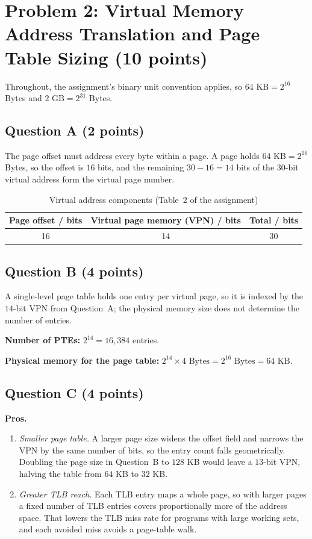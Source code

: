\section*{Problem 2: Virtual Memory Address Translation and Page Table Sizing (10 points)}

Throughout, the assignment's binary unit convention applies, so
$64\text{ KB} = 2^{16}$ Bytes and $2\text{ GB} = 2^{31}$ Bytes.

\subsection*{Question A (2 points)}

The page offset must address every byte within a page. A page holds
$64\text{ KB} = 2^{16}$ Bytes, so the offset is $16$ bits, and the remaining
$30 - 16 = 14$ bits of the $30$-bit virtual address form the virtual page number.

\begin{table}[H]
  \centering
  \caption{Virtual address components (Table~2 of the assignment)}
  \label{p2:tab:vaddr}
  \begin{tabular}{ccc}
    \toprule
    Page offset / bits & Virtual page memory (VPN) / bits & Total / bits \\
    \midrule
    16 & 14 & 30 \\
    \bottomrule
  \end{tabular}
\end{table}

\subsection*{Question B (4 points)}

A single-level page table holds one entry per virtual page, so it is indexed by the
$14$-bit VPN from Question~A; the physical memory size does not determine the number
of entries.

\textbf{Number of PTEs:} $2^{14} = 16{,}384$ entries.

\textbf{Physical memory for the page table:}
$2^{14} \times 4\text{ Bytes} = 2^{16}\text{ Bytes} = 64\text{ KB}$.

\subsection*{Question C (4 points)}

\textbf{Pros.}
\begin{enumerate}
  \item \emph{Smaller page table.} A larger page size widens the offset field and
    narrows the VPN by the same number of bits, so the entry count falls
    geometrically. Doubling the page size in Question~B to $128$ KB would leave a
    $13$-bit VPN, halving the table from $64$ KB to $32$ KB.
  \item \emph{Greater TLB reach.} Each TLB entry maps a whole page, so with larger
    pages a fixed number of TLB entries covers proportionally more of the address
    space. That lowers the TLB miss rate for programs with large working sets, and
    each avoided miss avoids a page-table walk.
\end{enumerate}

